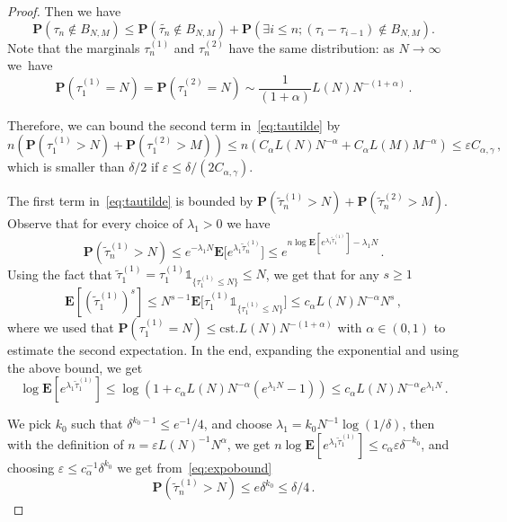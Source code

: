 \documentclass[10pt]{amsart}
\theoremstyle{definition}\newtheorem{defi}[theo]{Definition}\newtheorem{rema}[theo]{Remark}\newtheorem{exam}[theo]{Example}\newtheorem{exem}[theo]{Example}\newtheorem{nota}[theo]{Notation}
\newcommand{\ga}{\alpha}
\newcommand{\gd}{\delta}
\newcommand{\gep}{\varepsilon}
\newcommand{\unbf}%
{\mathds{1}}
\renewcommand{\tilde}{\widetilde}
\newcommand{\bP}{\ensuremath{\mathbf{P}}}
\newcommand{\bE}{\ensuremath{\mathbf{E}}}
\newcommand\cst{\mathrm{cst}}
\let\oldexists\exists
\renewcommand*{\exists}{\mathrel{\oldexists}}
\begin{document}
\begin{appendix}
\begin{proof}
Then we have
\begin{equation}\label{eq:tautilde}
\bP \left(\tau_n \notin B_{N,M} \right) \le \bP \left(\tilde{\tau_n} \notin B_{N,M} \right) + \bP \left(\exists i \le n ; (\tau_i - \tau_{i-1}) \notin B_{N,M} \right).
\end{equation}
Note that the marginals $\tau^{(1)}_n$ and $\tau^{(2)}_n$ have the same distribution: as $N \to \infty$ we~have
\begin{equation}
\bP(\tau^{(1)}_1= N) = \bP(\tau^{(2)}_1= N) \sim \frac{1}{(1+\ga)} L(N) N^{-(1+ \ga)}\,.
\end{equation}

Therefore, we can bound the second term in~\eqref{eq:tautilde} by
\begin{equation}
n \left(\bP (\tau^{(1)}_1 \!>\! N)\!+\! \bP (\tau^{(2)}_1 \!>\! M) \right) \le n \left(C_{\ga} L(N) N^{-\ga} \!+\!C_{\ga} L(M) M^{-\ga}\right) \le \gep C_{\ga,\gamma}\,,
\end{equation}
which is smaller than $\gd/2$ if $\gep \leq \gd/(2 C_{\ga,\gamma})$.

The first term in~\eqref{eq:tautilde} is bounded by $ \bP(\tilde{\tau}^{(1)}_n > N) + \bP(\tilde{\tau}^{(2)}_n > M)$. Observe that for every choice of $\lambda_1 >0$ we have
\begin{equation}
\bP (\tilde{\tau}^{(1)}_n > N) \le e^{ -\lambda_1 N} \bE \big[e^{\lambda_1 \tilde{\tau}^{(1)}_n}\big]
\le e^{n \log \bE[e^{\lambda_1 \tilde{\tau}^{(1)}_1}] - \lambda_1 N }\,.\label{eq:expobound}
\end{equation}
Using the fact that $\tilde \tau_1^{(1)} = \tau_1^{(1)} \unbf_{\{\tau_1^{(1)}\leq N \}}\leq N$, we get that for any $s \ge 1$
\begin{equation}
\bE [(\tilde{\tau}^{(1)}_1)^s] \le N^{s-1}
\bE \big[\tau^{(1)}_1 \unbf_{\{\tau^{(1)}_1 \leq N\}}\big] \le c_{\ga} L(N) N^{- \ga } N^s\,,
\end{equation}
where we used that $\bP(\tau_1^{(1)} =N) \leq \cst. L(N) N^{-(1+\ga)}$ with $\ga\in(0,1)$ to estimate the second expectation. In the end, expanding the exponential and using the above bound, we get
\begin{equation}
\log \bE \left[e^{\lambda_1 \tilde{\tau}^{(1)}_1} \right] \le \log \left(1 + c_{\ga} L(N) N^{- \ga } (e^{\lambda_1 N} -1) \right) \le c_{\ga} L(N) N^{- \ga } e^{\lambda_1 N}\,.
\end{equation}

We pick $k_0$ such that $\gd^{k_0-1}\leq e^{-1}/4$, and choose $\lambda_1 = k_0 N^{-1} \log(1/ \delta)$, then with the definition of $n=\gep L(N)^{-1} N^{\ga}$, we get $n \log \bE [e^{\lambda_1 \tilde{\tau}^{(1)}_1}] \le c_{\ga} \gep \delta^{-k_0} $, and choosing $\gep\leq c_{\ga}^{-1} \gd^{k_0}$ we get from~\eqref{eq:expobound}
\begin{equation}
\bP(\tilde{\tau}^{(1)}_n > N) \le e \gd^{k_0} \leq \gd/4\,.
\end{equation}


\end{proof}
\end{appendix}
\end{document}
